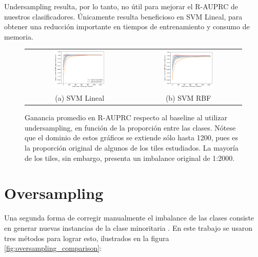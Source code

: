 Undersampling resulta, por lo tanto, no útil para mejorar el R-AUPRC de nuestros clasificadores. Únicamente resulta beneficioso en SVM Lineal, para obtener una reducción importante en tiempos de entrenamiento y consumo de memoria.

\begin{figure}[h!]
\begin{tabular}{cc}
  \includegraphics[width=0.49\textwidth]{Kap7/linearBEST.png} &   \includegraphics[width=0.49\textwidth]{Kap7/rbfBEST.png} \\
(a) SVM Lineal& (b) SVM RBF
\end{tabular}
\caption{ Ganancia promedio en R-AUPRC respecto al baseline al utilizar undersampling, en función de la proporción entre las clases. Nótese que el dominio de estos gráficos se extiende sólo hasta 1200, pues es la proporción original de algunos de los tiles estudiados. La mayoría de los tiles, sin embargo, presenta un imbalance original de 1:2000. }
\label{fig:overall_undersampling}
\end{figure}

\section{Oversampling}

Una segunda forma de corregir manualmente el imbalance de las clases consiste en generar nuevas instancias de la clase minoritaria \cite{he}. En este trabajo se usaron tres métodos para lograr esto, ilustrados en la figura \ref{fig:oversampling_comparison}:

